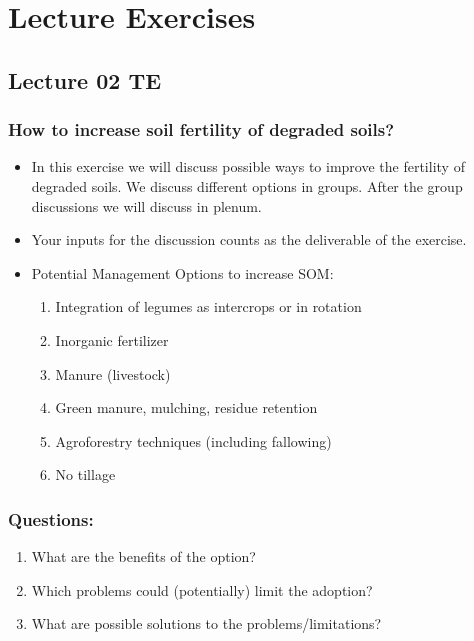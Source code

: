 \chapter{Lecture Exercises}
\setlength{\headheight}{22.94003pt}
\addtolength{\topmargin}{-10.22661pt}




\section{Lecture 02 TE}
\subsection*{How to increase soil fertility of degraded soils?}

\begin{itemize}
    \item In this exercise we will discuss possible ways to improve the fertility of degraded soils. We discuss different options in groups. After the group discussions we will discuss in plenum.
    \item Your inputs for the discussion counts as the deliverable of the exercise.
    \item Potential Management Options to increase SOM:
    \begin{enumerate}
        \item Integration of legumes as intercrops or in rotation
        \item Inorganic fertilizer
        \item Manure (livestock)
        \item Green manure, mulching, residue retention
        \item Agroforestry techniques (including fallowing)
        \item No tillage
    \end{enumerate}
\end{itemize}

\subsection*{Questions:}
\begin{enumerate}
    \item What are the benefits of the option?
    \item Which problems could (potentially) limit the adoption?
    \item What are possible solutions to the problems/limitations?
\end{enumerate}

